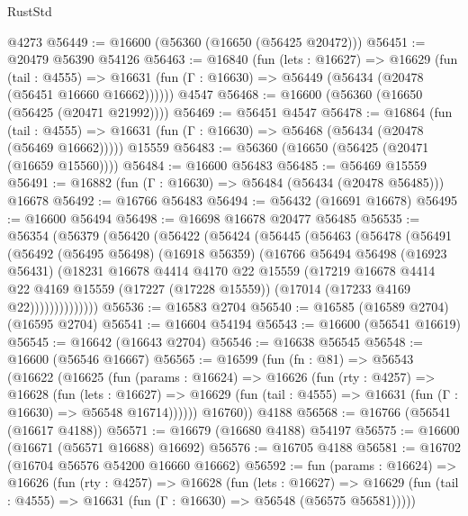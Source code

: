 \begin{lexlean}{RustStd}
\begin{coremodule}
{\begin{coremodule}
{{{{{{{{{{{{{{{{{{{{{{{{{{{{{{{{{{{{{{{{{{{{{{{{{{{{{{{    @4273
@56449 := @16600 (@56360 (@16650 (@56425 @20472)))
@56451 := @20479 @56390 @54126
@56463 := @16840
    (fun (lets : @16627) =>
    @16629
      (fun (tail : @4555) =>
      @16631 (fun (Γ : @16630) => @56449 (@56434 (@20478 (@56451 @16660 @16662))))))
    @4547
@56468 := @16600 (@56360 (@16650 (@56425 (@20471 @21992))))
@56469 := @56451 @4547
@56478 := @16864
    (fun (tail : @4555) => @16631 (fun (Γ : @16630) => @56468 (@56434 (@20478 (@56469 @16662)))))
    @15559
@56483 := @56360 (@16650 (@56425 (@20471 (@16659 @15560))))
@56484 := @16600 @56483
@56485 := @56469 @15559
@56491 := @16882 (fun (Γ : @16630) => @56484 (@56434 (@20478 @56485))) @16678
@56492 := @16766 @56483
@56494 := @56432 (@16691 @16678)
@56495 := @16600 @56494
@56498 := @16698 @16678 @20477 @56485
@56535 := @56354
    (@56379
      (@56420
        (@56422
          (@56424
            (@56445
              (@56463
                (@56478
                  (@56491
                    (@56492
                      (@56495 @56498)
                      (@16918 @56359)
                      (@16766
                        @56494
                        @56498
                        (@16923 @56431)
                        (@18231
                          @16678
                          @4414
                          @4170
                          @22
                          @15559
                          (@17219
                            @16678
                            @4414
                            @22
                            @4169
                            @15559
                            (@17227 (@17228 @15559))
                            (@17014 (@17233 @4169 @22))))))))))))))
@56536 := @16583 @2704
@56540 := @16585 (@16589 @2704) (@16595 @2704)
@56541 := @16604 @54194
@56543 := @16600 (@56541 @16619)
@56545 := @16642 (@16643 @2704)
@56546 := @16638 @56545
@56548 := @16600 (@56546 @16667)
@56565 := @16599
    (fun (fn : @81) =>
    @56543
      (@16622
        (@16625
          (fun (params : @16624) =>
          @16626
            (fun (rty : @4257) =>
            @16628
              (fun (lets : @16627) =>
              @16629 (fun (tail : @4555) => @16631 (fun (Γ : @16630) => @56548 @16714))))))
        @16760))
    @4188
@56568 := @16766 (@56541 (@16617 @4188))
@56571 := @16679 (@16680 @4188) @54197
@56575 := @16600 (@16671 (@56571 @16688) @16692)
@56576 := @16705 @4188
@56581 := @16702 (@16704 @56576 @54200 @16660 @16662)
@56592 := fun (params : @16624) =>
  @16626
    (fun (rty : @4257) =>
    @16628
      (fun (lets : @16627) =>
      @16629 (fun (tail : @4555) => @16631 (fun (Γ : @16630) => @56548 (@56575 @56581)))))
}}}}}}}}}}}}}}}}}}}}}}}}}}}}}}}}}}}}}}}}}}}}}}}}}}}}}}}
\end{coremodule}}
\end{coremodule}
\end{lexlean}
